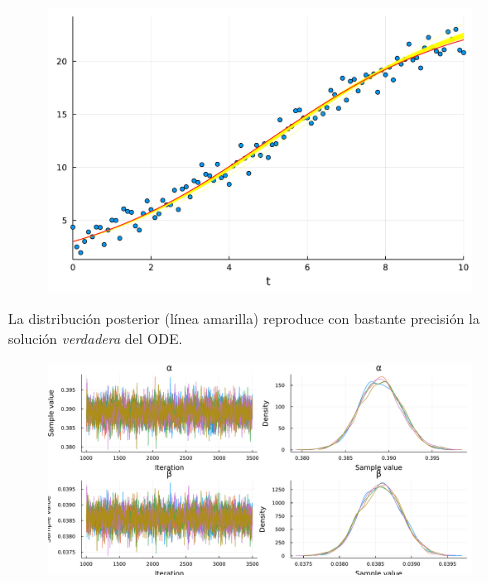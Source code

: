 \documentclass[11pt]{beamer}
\begin{document}
\begin{frame}
	\begin{figure}
		\includegraphics[scale=0.5]{images/final_plot.pdf}
	\end{figure}
	La distribución posterior (línea amarilla) reproduce con bastante precisión la solución \textit{verdadera} del ODE.
\end{frame}

\begin{frame}
	\begin{figure}
		\includegraphics[scale=0.35]{images/chain_resultados.pdf}
	\end{figure}
\end{frame}
\end{document}
